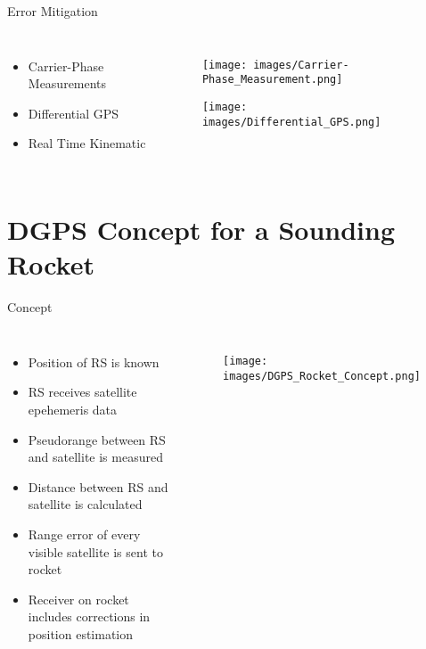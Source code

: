 \documentclass[12pt, compress, xcolor=table]{beamer}
\begin{document}
\begin{frame}{Error Mitigation}
  \begin{columns}
  \begin{itemize}
  \setlength\itemsep{0.5cm}
   \item Carrier-Phase Measurements
   \item Differential GPS
   \item Real Time Kinematic
  \end{itemize}

  \begin{figure}
   \texttt{[image: images/Carrier-Phase\_Measurement.png]}
  
  \texttt{[image: images/Differential\_GPS.png]}
  \end{figure}   
  
 \end{columns}
\end{frame}


\section{DGPS Concept for a Sounding Rocket}

\begin{frame}{Concept}
 \begin{columns}
  \begin{itemize}
   \footnotesize
   \item Position of RS is known
   \item RS receives satellite epehemeris data
   \item Pseudorange between RS and satellite is measured
   \item Distance between RS and satellite is calculated
   \item Range error of every visible satellite is sent to rocket
   \item Receiver on rocket includes corrections in position estimation
  \end{itemize}

  \begin{figure}
   \texttt{[image: images/DGPS\_Rocket\_Concept.png]}
  \end{figure}   
  
 \end{columns}
\end{frame}
\end{document}
